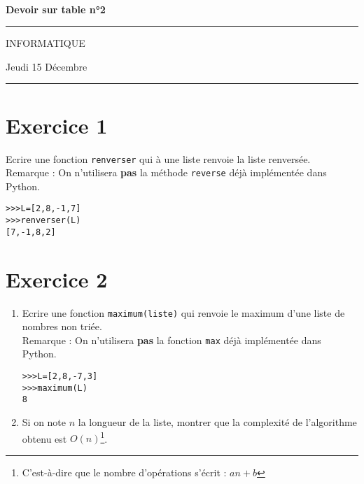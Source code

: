 \documentclass[a4paper,12pt]{article}
\begin{document}
\\

\begin{center}
{\LARGE  \textbf{Devoir sur table n°2}  \bigskip }

\rule{2.39cm}{0.05cm}

\bi 

{\large INFORMATIQUE }\bigskip

{\large Jeudi 15 D\' ecembre}

\rule{2.39cm}{0.05cm}
\end{center}


\noi{}

\section*{Exercice 1}
\noi Ecrire une fonction \verb?renverser? qui \` a une liste renvoie la liste renvers\' ee.\\
Remarque : On n'utilisera \textbf{pas} la m\' ethode \verb?reverse? d\' ej\` a impl\' ement\' ee dans Python.
\begin{verbatim}
>>>L=[2,8,-1,7]
>>>renverser(L)
[7,-1,8,2]
\end{verbatim}

\section*{Exercice 2}
\begin{enumerate}
\item Ecrire une fonction \verb?maximum(liste)? qui renvoie le maximum d'une liste de nombres non tri\' ee.\\
Remarque : On n'utilisera \textbf{pas} la fonction \verb?max? d\' ej\` a impl\' ement\' ee dans Python.
\begin{verbatim}
>>>L=[2,8,-7,3]
>>>maximum(L)
8
\end{verbatim}
\item Si on note $n$ la longueur de la liste, montrer que la complexit\' e de l'algorithme obtenu est $O(n)$\footnote{C'est-\` a-dire que le nombre d'op\' erations s'\' ecrit : $an+b$}. 
\end{enumerate}
\end{document}
